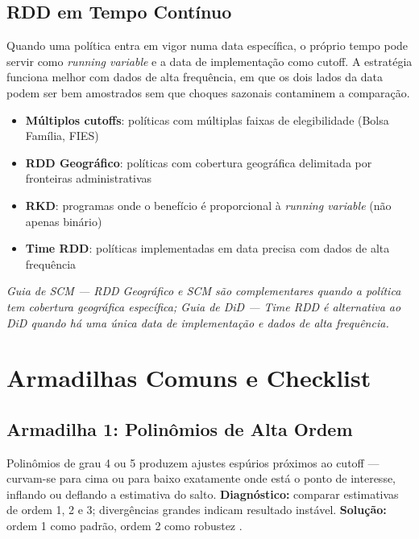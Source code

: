 \documentclass[12pt, a4paper, openany]{book}
\begin{document}
\section{RDD em Tempo Cont\'inuo}

Quando uma pol\'itica entra em vigor numa data espec\'ifica, o pr\'oprio tempo pode servir como \textit{running variable} e a data de implementa\c{c}\~ao como cutoff. A estrat\'egia funciona melhor com dados de alta frequ\^encia, em que os dois lados da data podem ser bem amostrados sem que choques sazonais contaminem a compara\c{c}\~ao.

\begin{notabox}
\begin{itemize}[leftmargin=1.2cm, itemsep=2pt]
  \item \textbf{M\'ultiplos cutoffs}: pol\'iticas com m\'ultiplas faixas de elegibilidade (Bolsa Fam\'ilia, FIES)
  \item \textbf{RDD Geogr\'afico}: pol\'iticas com cobertura geogr\'afica delimitada por fronteiras administrativas
  \item \textbf{RKD}: programas onde o benef\'icio \'e proporcional \`a \textit{running variable} (n\~ao apenas bin\'ario)
  \item \textbf{Time RDD}: pol\'iticas implementadas em data precisa com dados de alta frequ\^encia
\end{itemize}
\end{notabox}

\begin{conexaobox}
\textit{Guia de SCM --- RDD Geogr\'afico e SCM s\~ao complementares quando a pol\'itica tem cobertura geogr\'afica espec\'ifica; Guia de DiD --- Time RDD \'e alternativa ao DiD quando h\'a uma \'unica data de implementa\c{c}\~ao e dados de alta frequ\^encia.}
\end{conexaobox}


\chapter{Armadilhas Comuns e Checklist}

\section{Armadilha 1: Polin\^omios de Alta Ordem}

Polin\^omios de grau 4 ou 5 produzem ajustes esp\'urios pr\'oximos ao cutoff --- curvam-se para cima ou para baixo exatamente onde est\'a o ponto de interesse, inflando ou deflando a estimativa do salto. \textbf{Diagn\'ostico:} comparar estimativas de ordem 1, 2 e 3; diverg\^encias grandes indicam resultado inst\'avel. \textbf{Solu\c{c}\~ao:} ordem 1 como padr\~ao, ordem 2 como robustez \citep{GelmanImbens2019}.
\end{document}
